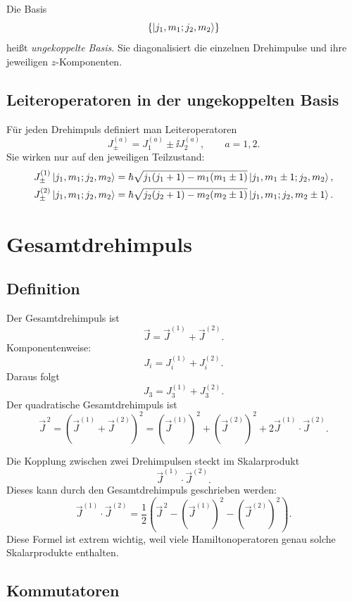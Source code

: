 \begin{definitionbox}
Die Basis
\[
    \left\{ \left|j_1,m_1;j_2,m_2\right\rangle \right\}
\]
heißt \emph{ungekoppelte Basis}. Sie diagonalisiert die einzelnen Drehimpulse und ihre jeweiligen \(z\)-Komponenten.
\end{definitionbox}

\subsection{Leiteroperatoren in der ungekoppelten Basis}

Für jeden Drehimpuls definiert man Leiteroperatoren
\[
    J^{(a)}_\pm = J^{(a)}_1 \pm \ii J^{(a)}_2,
    \qquad a=1,2.
\]
Sie wirken nur auf den jeweiligen Teilzustand:
\begin{align*}
    J^{(1)}_\pm\left|j_1,m_1;j_2,m_2\right\rangle
    &=\hbar\sqrt{j_1(j_1+1)-m_1(m_1\pm1)}
    \left|j_1,m_1\pm1;j_2,m_2\right\rangle,\\
    J^{(2)}_\pm\left|j_1,m_1;j_2,m_2\right\rangle
    &=\hbar\sqrt{j_2(j_2+1)-m_2(m_2\pm1)}
    \left|j_1,m_1;j_2,m_2\pm1\right\rangle.
\end{align*}

\section{Gesamtdrehimpuls}

\subsection{Definition}

Der Gesamtdrehimpuls ist
\[
    \vec J=\vec J^{(1)}+\vec J^{(2)}.
\]
Komponentenweise:
\[
    J_i=J^{(1)}_i+J^{(2)}_i.
\]
Daraus folgt
\[
    J_3 = J^{(1)}_3+J^{(2)}_3.
\]
Der quadratische Gesamtdrehimpuls ist
\[
    \vec J^{\,2}
    = (\vec J^{(1)}+\vec J^{(2)})^2
    = (\vec J^{(1)})^2+(\vec J^{(2)})^2+2\vec J^{(1)}\cdot \vec J^{(2)}.
\]

\begin{formulabox}
Die Kopplung zwischen zwei Drehimpulsen steckt im Skalarprodukt
\[
    \vec J^{(1)}\cdot\vec J^{(2)}.
\]
Dieses kann durch den Gesamtdrehimpuls geschrieben werden:
\[
    \vec J^{(1)}\cdot\vec J^{(2)}
    =\frac12\left(\vec J^{\,2}-(\vec J^{(1)})^2-(\vec J^{(2)})^2\right).
\]
Diese Formel ist extrem wichtig, weil viele Hamiltonoperatoren genau solche Skalarprodukte enthalten.
\end{formulabox}

\subsection{Kommutatoren}

